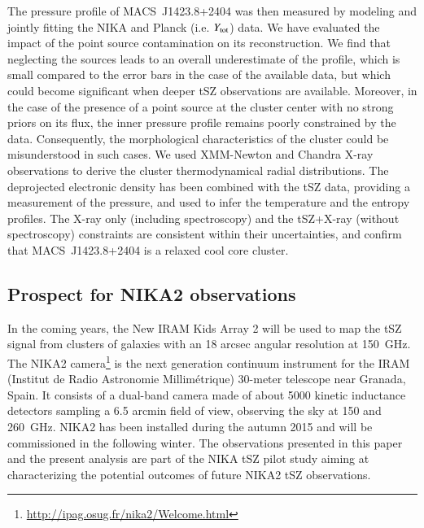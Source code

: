 \documentclass[twocolumn,traditabstract]{aa}
\begin{document}
The pressure profile of \mbox{MACS~J1423.8+2404} was then measured by modeling and jointly fitting the NIKA and Planck (i.e. $Y_{\rm tot}$) data. We have evaluated the impact of the point source contamination on its reconstruction. We find that neglecting the sources leads to an overall underestimate of the profile, which is small compared to the error bars in the case of the available data, but which could become significant when deeper tSZ observations are available. Moreover, in the case of the presence of a point source at the cluster center with no strong priors on its flux, the inner pressure profile remains poorly constrained by the data. Consequently, the morphological characteristics of the cluster could be misunderstood in such cases. We used XMM-Newton and Chandra X-ray observations to derive the cluster thermodynamical radial distributions. The deprojected electronic density has been combined with the tSZ data, providing a measurement of the pressure, and used to infer the temperature and the entropy profiles. The X-ray only (including spectroscopy) and the tSZ+X-ray (without spectroscopy) constraints are consistent within their uncertainties, and confirm that \mbox{MACS~J1423.8+2404} is a relaxed cool core cluster.

\subsection{Prospect for NIKA2 observations}
In the coming years, the New IRAM Kids Array 2 \citep[NIKA2][]{monfardini2014} will be used to map the tSZ signal from clusters of galaxies with an 18 arcsec angular resolution at 150~GHz. The NIKA2 camera\footnote{\url{http://ipag.osug.fr/nika2/Welcome.html}} is the next generation continuum instrument for the IRAM (Institut de Radio Astronomie Millim\'etrique) 30-meter telescope near Granada, Spain. It consists of a dual-band camera made of about 5000 kinetic inductance detectors sampling a 6.5 arcmin field of view, observing the sky at 150 and 260~GHz. NIKA2 has been installed during the autumn 2015 and will be commissioned in the following winter. The observations presented in this paper and the present analysis are part of the NIKA tSZ pilot study aiming at characterizing the potential outcomes of future NIKA2 tSZ observations.
\end{document}
